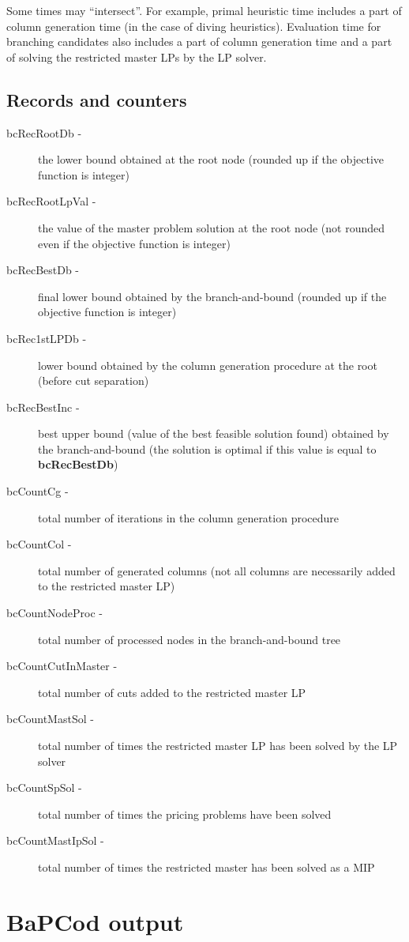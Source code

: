 \documentclass[10pt,a4paper]{article}
\newcommand{\bc}{BaPCod\xspace}
\begin{document}
Some times may ``intersect''. For example, primal heuristic time includes a part of column generation time (in the case
of diving heuristics). Evaluation time for branching candidates also includes a part of column generation time and a
part of solving the restricted master LPs by the LP solver. 

\subsection{Records and counters }

\begin{description}
\item[bcRecRootDb -] the lower bound obtained at the root node (rounded up if the objective function is integer)
\item[bcRecRootLpVal -] the value of the master problem solution at the root node (not rounded even if the objective
  function is integer)
\item[bcRecBestDb -] final lower bound obtained by the branch-and-bound (rounded up if the objective function is
  integer)
\item[bcRec1stLPDb -] lower bound obtained by the column generation procedure at the root (before cut separation)
\item[bcRecBestInc -] best upper bound (value of the best feasible solution found) obtained by the branch-and-bound (the
  solution is optimal if this value is equal to {\bf bcRecBestDb})
\item[bcCountCg -] total number of iterations in the column generation procedure
\item[bcCountCol -] total number of generated columns (not all columns are necessarily added to the restricted master LP)
\item[bcCountNodeProc -] total number of processed nodes in the branch-and-bound tree
\item[bcCountCutInMaster -] total number of cuts added to the restricted master LP
\item[bcCountMastSol -] total number of times the restricted master LP has been solved by the LP solver
\item[bcCountSpSol -] total number of times the pricing problems have been solved
\item[bcCountMastIpSol -] total number of times the restricted master has been solved as a MIP 
\end{description}

\section{\bc output}
\label{sec:output}
\end{document}
